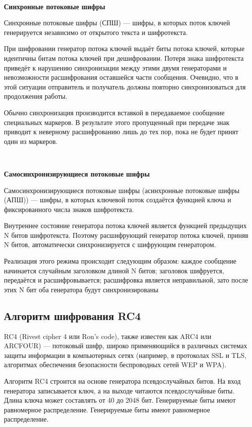 \documentclass[a4paper]{report}
\begin{document}
~

\textbf{Синхронные потоковые шифры}

Синхронные потоковые шифры (СПШ) — шифры, в которых поток ключей генерируется независимо от открытого текста и шифротекста.

При шифровании генератор потока ключей выдаёт биты потока ключей, которые идентичны битам потока ключей при дешифровании. Потеря знака шифротекста приведёт к нарушению синхронизации между этими двумя генераторами и невозможности расшифрования оставшейся части сообщения. Очевидно, что в этой ситуации отправитель и получатель должны повторно синхронизоваться для продолжения работы.

Обычно синхронизация производится вставкой в передаваемое сообщение специальных маркеров. В результате этого пропущенный при передаче знак приводит к неверному расшифрованию лишь до тех пор, пока не будет принят один из маркеров.

~

\textbf{Самосинхронизирующиеся потоковые шифры}

Самосинхронизирующиеся потоковые шифры (асинхронные потоковые шифры (АПШ)) — шифры, в которых ключевой поток создаётся функцией ключа и фиксированного числа знаков шифротекста.

Внутреннее состояние генератора потока ключей является функцией предыдущих N битов шифротекста. Поэтому расшифрующий генератор потока ключей, приняв N битов, автоматически синхронизируется с шифрующим генератором.

Реализация этого режима происходит следующим образом: каждое сообщение начинается случайным заголовком длиной N битов; заголовок шифруется, передаётся и расшифровывается; расшифровка является неправильной, зато после этих N бит оба генератора будут синхронизированы


\subsection{Алгоритм шифрования RC4}

RC4 (Rivest cipher 4 или Ron’s code), также известен как ARC4 или ARCFOUR) — потоковый шифр, широко применяющийся в различных системах защиты информации в компьютерных сетях (например, в протоколах SSL и TLS, алгоритмах обеспечения безопасности беспроводных сетей WEP и WPA).

Алгоритм RC4 строится на основе генератора псевдослучайных битов. На вход генератора записывается ключ, а на выходе читаются псевдослучайные биты. Длина ключа может составлять от 40 до 2048 бит. Генерируемые биты имеют равномерное распределение. Генерируемые биты имеют равномерное распределение.
\end{document}
